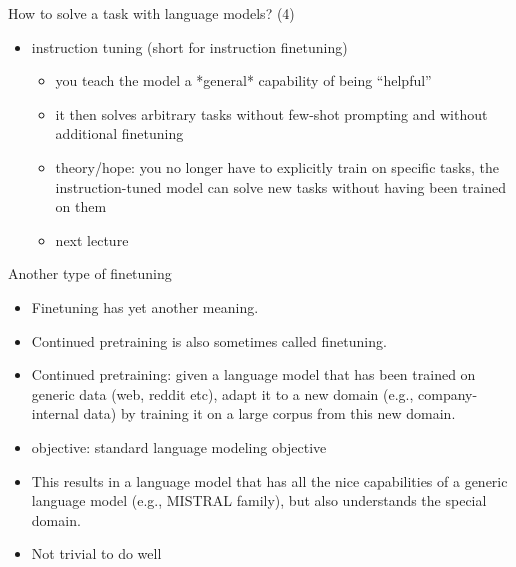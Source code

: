 \begin{frame}{How to solve a task with language models? (4)}

\vfill

\begin{itemize}
\item instruction tuning (short for instruction finetuning)
        \begin{itemize}
            \item you teach the model a *general*
            capability of being ``helpful''
            \item it then solves arbitrary tasks without few-shot
            prompting and without additional finetuning
            \item theory/hope: you no longer have to explicitly
            train on specific tasks, the instruction-tuned
            model can solve new tasks without having been
            trained on them
            \item next lecture
        \end{itemize}
\end{itemize}

\vfill

\end{frame}



\begin{frame}{Another type of finetuning}

\vfill

\begin{itemize}
    \item Finetuning has yet another meaning.
    \item Continued pretraining is also sometimes called
    finetuning.
    \item Continued pretraining: given a language model
that has been    trained on generic data (web, reddit etc),
    adapt it to a new domain (e.g., company-internal data) by
    training it on a large corpus from this new domain.
\item objective: standard language modeling objective
    \item This results in a language model that has all the
    nice capabilities of a generic language model (e.g.,
    MISTRAL family), but also understands the special domain.
\item Not trivial to do well
\end{itemize}

\vfill

\end{frame}

